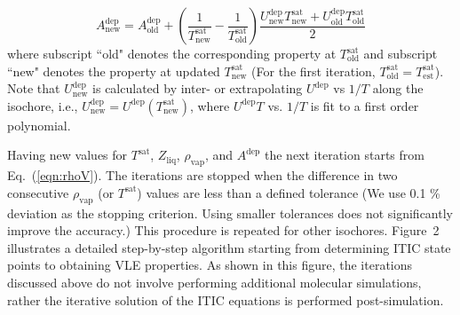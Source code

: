 \documentclass[5p,times]{elsarticle}
\begin{document}
\begin{equation}
A^\mathrm{dep}_\mathrm{new} = A^\mathrm{dep}_\mathrm{old} + \left( \frac{1}{T^\mathrm{sat}_\mathrm{new}}-\frac{1}{T^\mathrm{sat}_\mathrm{old}} \right) \frac{U^\mathrm{dep}_\mathrm{new}T^\mathrm{sat}_\mathrm{new}+U^\mathrm{dep}_\mathrm{old}T^\mathrm{sat}_\mathrm{old}}{2} 
\label{eqn:aDepCorrection}
\end{equation}
where subscript ``old" denotes the corresponding property at $T^\mathrm{sat}_\mathrm{old}$ and subscript ``new" denotes the property at updated $T^\mathrm{sat}_\mathrm{new}$ (For the first iteration, $T^\mathrm{sat}_\mathrm{old} = T^\mathrm{sat}_\mathrm{est}$). Note that $U^\mathrm{dep}_\mathrm{new}$ is calculated by inter- or extrapolating $U^\mathrm{dep}$ vs $1/T$ along the isochore, i.e., $U^\mathrm{dep}_\mathrm{new} = U^\mathrm{dep}(T^\mathrm{sat}_\mathrm{new})$, where  $U^\mathrm{dep}T$ vs. $1/T$ is fit to a first order polynomial.

Having new values for $T^\mathrm{sat}$, $Z_{\mathrm{liq}}$, $\rho_\mathrm{vap}$, and $A^\mathrm{dep}$ the next iteration starts from Eq.~(\ref{eqn:rhoV}). The iterations are stopped when the difference in two consecutive $\rho_\mathrm{vap}$ (or $T^\mathrm{sat}$) values are less than a defined tolerance (We use 0.1 \% deviation as the stopping criterion. Using smaller tolerances does not significantly improve the accuracy.) This procedure is repeated for other isochores. Figure~2 illustrates a detailed step-by-step algorithm starting from determining ITIC state points to obtaining VLE properties. As shown in this figure, the iterations discussed above do not involve performing additional molecular simulations, rather the iterative solution of the ITIC equations is performed post-simulation. 
\end{document}
